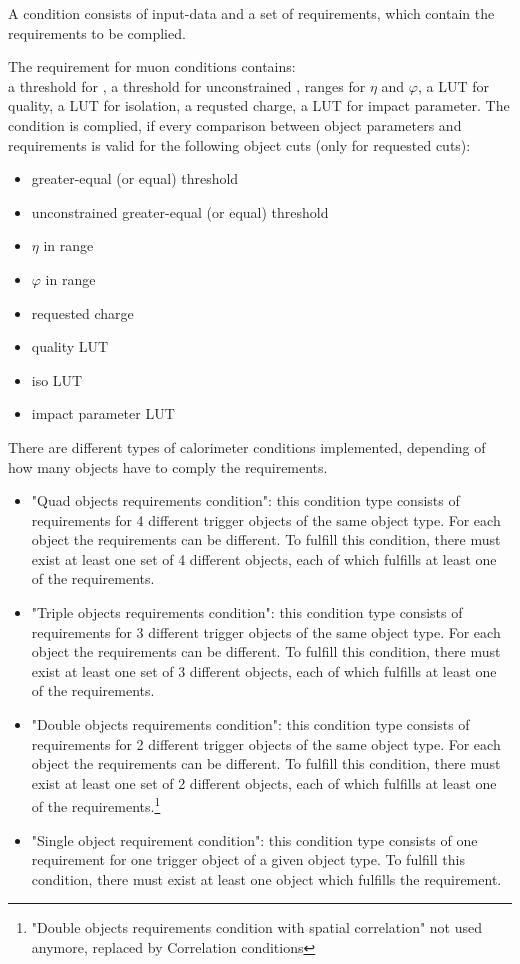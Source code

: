 A condition consists of input-data and a set of requirements, which contain the requirements to be complied.

The requirement for muon conditions contains:\\
a threshold for \pt, a threshold for unconstrained \pt, ranges for $\eta$ and $\varphi$, a LUT for quality, a LUT for isolation, 
a requsted charge, a LUT for impact parameter.
The condition is complied, if every comparison between object parameters and requirements is valid for the following object cuts (only for requested cuts):
\begin{itemize}
\item \pt greater-equal (or equal) threshold
\item unconstrained \pt greater-equal (or equal) threshold
\item $\eta$ in range
\item $\varphi$ in range
\item requested charge 
\item quality LUT
\item iso LUT
\item impact parameter LUT
\end{itemize}

There are different types of calorimeter conditions implemented, depending of how many objects have to comply the requirements.
\begin{itemize}
\item "Quad objects requirements condition": this condition type consists of requirements for 4 different trigger objects of the same object type. 
For each object the requirements can be different. To fulfill this condition, there must exist at least one set of 4 different objects,
each of which fulfills at least one of the requirements.
\item "Triple objects requirements condition": this condition type consists of requirements for 3 different trigger objects of the same object type. 
For each object the requirements can be different. To fulfill this condition, there must exist at least one set of 3 different objects,
each of which fulfills at least one of the requirements.
\item "Double objects requirements condition": this condition type consists of requirements for 2 different trigger objects of the same object type. 
For each object the requirements can be different. To fulfill this condition, there must exist at least one set of 2 different objects,
each of which fulfills at least one of the requirements.\footnote{"Double objects requirements condition with spatial correlation" not used anymore, replaced by Correlation conditions}
\item "Single object requirement condition": this condition type consists of one requirement for one trigger object of a given object type. 
To fulfill this condition, there must exist at least one object which fulfills the requirement.

\end{itemize}

